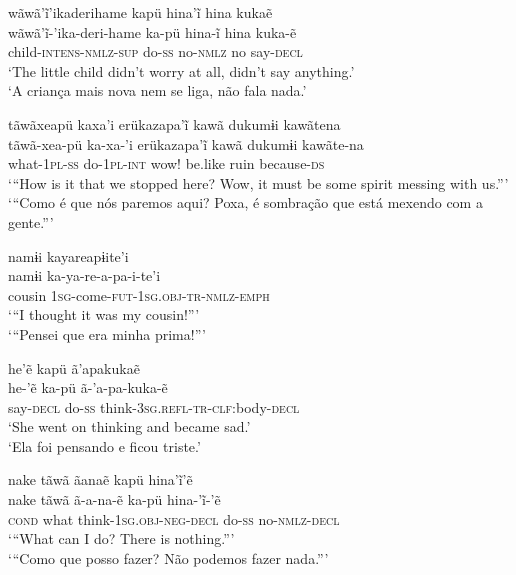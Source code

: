\documentclass[output=paper,
modfonts,nonflat
]{langsci/langscibook}
\begin{document}
\z

\ea   wãwã'ĩ'ikaderihame kapü hina'ĩ  hina kukaẽ \\[.3em]
\gll  wãwã'ĩ-'ika-deri-hame ka-pü hina-ĩ  hina kuka-ẽ \\
child-\textsc{intens-nmlz-sup} do-\textsc{ss} no-\textsc{nmlz} no say-\textsc{decl}\\
\glt    `The little child didn't worry at all, didn't say anything.' \\
`A criança mais nova nem se liga, não fala nada.' \\
\z

\ea   tãwãxeapü kaxa'i erükazapa'ĩ kawã dukumɨi kawãtena \\[.3em]
\gll tãwã-xea-pü ka-xa-'i erükazapa'ĩ kawã dukumɨi kawãte-na\\
what-\textsc{1pl-ss} do-\textsc{1pl-int} wow! be.like ruin because-\textsc{ds}\\
  \glt    `{``}How is it that we stopped here? Wow, it must be some spirit messing with us.{''}' \\
`{``}Como é que nós paremos aqui? Poxa, é sombração que está mexendo com a gente.{''}'
\z          

\newpage 
\ea   namɨi kayareapɨite'i \\[.3em]
\gll namɨi ka-ya-re-a-pa-i-te'i\\
cousin \textsc{1sg}-come-\textsc{fut-1sg.obj-tr-nmlz-emph}\\
\glt  `{``}I thought it was my cousin!{''}' \\
`{``}Pensei que era minha prima!{''}' \\
\z  

\ea   he'ẽ kapü ã'apakukaẽ \\[.3em]
\gll  he-'ẽ ka-pü ã-'a-pa-kuka-ẽ \\
say-\textsc{decl} do-\textsc{ss} think-\textsc{3sg.refl-tr-clf:}body-\textsc{decl}\\
\glt `She went on thinking and became sad.'\\
`Ela foi pensando e ficou triste.'
\z  

\ea   nake tãwã ãanaẽ kapü hina'ĩ'ẽ \\[.3em]
\gll nake tãwã ã-a-na-ẽ ka-pü hina-'ĩ-'ẽ \\
\textsc{cond} what think-\textsc{1sg.obj-neg-decl} do-\textsc{ss} no-\textsc{nmlz-decl}\\
\glt    `{``}What can I do? There is nothing.{''}'\\
`{``}Como que posso fazer? Não podemos fazer nada.{''}'\\
\z  
\end{document}
